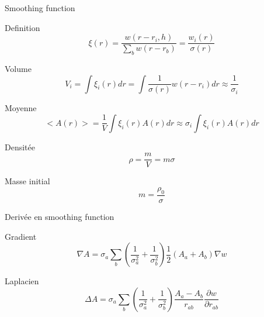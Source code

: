\begin{frame}{Smoothing function}
 \begin{block}{Definition}
 \begin{equation*}
  \xi(r)=\frac{w(r-r_{i},h)}{\sum_{b} w(r-r_b)}=\frac{w_{i}(r)}{\sigma(r)}
  \end{equation*}
 \end{block}
\begin{block}{Volume}
 \begin{equation*}
  V_{i}=\int \xi_{i}(r) dr=\int \frac{1}{\sigma(r)}w(r-r_i)dr\approx \frac{1}{\sigma_i}
 \end{equation*}

\end{block}
\begin{block}{Moyenne}
 \begin{equation*}
  <A(r)>=\frac{1}{V}\int \xi_{i}(r)A(r)dr\approx \sigma_{i}\int \xi_{i}(r)A(r)dr
 \end{equation*}

\end{block}

\begin{block}{Densitée}
 \begin{equation*}
  \rho=\frac{m}{V}=m\sigma
 \end{equation*}
\end{block}

\begin{block}{Masse initial}
\begin{equation*}
 m=\frac{\rho_0}{\sigma}
\end{equation*}
\end{block}
\end{frame}

\begin{frame}{Derivée en smoothing function}
\begin{block}{Gradient}
 \begin{equation*}
  \nabla A=\sigma_{a}\sum_{b}\left(\frac{1}{\sigma_{a}^2}+\frac{1}{\sigma_{b}^2}\right)\frac{1}{2}\left(A_a+A_b\right)\nabla w
 \end{equation*}

\end{block}

\begin{block}{Laplacien}
\begin{equation*}
 \Delta A=\sigma_{a}\sum_{b}\left(\frac{1}{\sigma_{a}^2}+\frac{1}{\sigma_{b}^2}\right)\frac{A_a-A_b}{r_{ab}}\frac{\partial w}{\partial r_{ab}}
\end{equation*}

\end{block}
\end{frame}


